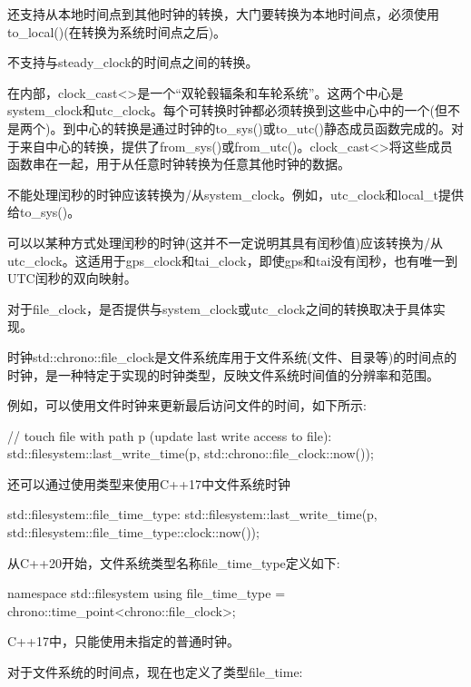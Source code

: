 还支持从本地时间点到其他时钟的转换，大门要转换为本地时间点，必须使用to\_local()(在转换为系统时间点之后)。

不支持与steady\_clock的时间点之间的转换。


在内部，clock\_cast<>是一个“双轮毂辐条和车轮系统”。这两个中心是system\_clock和utc\_clock。每个可转换时钟都必须转换到这些中心中的一个(但不是两个)。到中心的转换是通过时钟的to\_sys()或to\_utc()静态成员函数完成的。对于来自中心的转换，提供了from\_sys()或from\_utc()。clock\_cast<>将这些成员函数串在一起，用于从任意时钟转换为任意其他时钟的数据。

不能处理闰秒的时钟应该转换为/从system\_clock。例如，utc\_clock和local\_t提供给to\_sys()。

可以以某种方式处理闰秒的时钟(这并不一定说明其具有闰秒值)应该转换为/从utc\_clock。这适用于gps\_clock和tai\_clock，即使gps和tai没有闰秒，也有唯一到UTC闰秒的双向映射。

对于file\_clock，是否提供与system\_clock或utc\_clock之间的转换取决于具体实现。



时钟std::chrono::file\_clock是文件系统库用于文件系统(文件、目录等)的时间点的时钟，是一种特定于实现的时钟类型，反映文件系统时间值的分辨率和范围。

例如，可以使用文件时钟来更新最后访问文件的时间，如下所示:

\begin{cpp}
// touch file with path p (update last write access to file):
std::filesystem::last_write_time(p,
								 std::chrono::file_clock::now());
\end{cpp}

还可以通过使用类型来使用C++17中文件系统时钟

\begin{cpp}
std::filesystem::file_time_type:
	std::filesystem::last_write_time(p,
									std::filesystem::file_time_type::clock::now());
\end{cpp}

从C++20开始，文件系统类型名称file\_time\_type定义如下:

\begin{cpp}
namespace std::filesystem {
	using file_time_type = chrono::time_point<chrono::file_clock>;
}
\end{cpp}

C++17中，只能使用未指定的普通时钟。

对于文件系统的时间点，现在也定义了类型file\_time:

